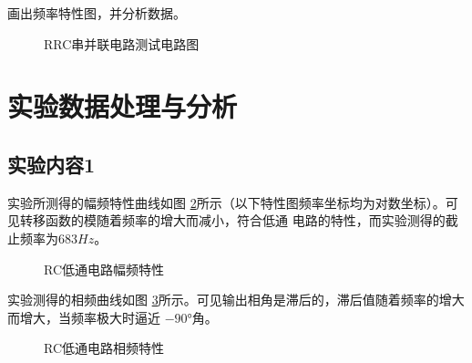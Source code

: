 \documentclass[a4paper,11pt,UTF8]{ctexart}
\begin{document}
画出频率特性图，并分析数据。

\begin{figure}[htbp]
  \centering
  \caption{RRC串并联电路测试电路图}
  \label{fig:BPF}
  \end{figure}

\newpage
\section{实验数据处理与分析}
\subsection{实验内容1}
  实验所测得的幅频特性曲线如图 \ref{fig:LPFH}所示（以下特性图频率坐标均为对数坐标）。可见转移函数的模随着频率的增大而减小，符合低通
  电路的特性，而实验测得的截止频率为$683Hz$。
  
  \begin{figure}[htbp]
    \centering
    \caption{RC低通电路幅频特性}
    \label{fig:LPFH}
    \end{figure}

  实验测得的相频曲线如图 \ref{fig:LPFPhi}所示。可见输出相角是滞后的，滞后值随着频率的增大而增大，当频率极大时逼近
  $-90°$角。
  \begin{figure}[htbp]
    \centering
    \caption{RC低通电路相频特性}
    \label{fig:LPFPhi}
    \end{figure}
\end{document}
